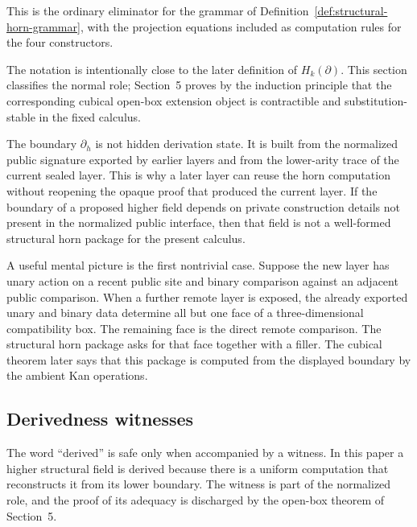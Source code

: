 \documentclass{lmcs}
\begin{document}
This is the ordinary eliminator for the grammar of
Definition~\ref{def:structural-horn-grammar}, with the projection equations included as
computation rules for the four constructors.

The notation is intentionally close to the later definition of \(H_k(\partial)\).  This
section classifies the normal role; Section~5 proves by the induction principle that the
corresponding cubical open-box extension object is contractible and substitution-stable in
the fixed calculus.

\begin{rem}
The boundary \(\partial_h\) is not hidden derivation state.  It is built from the normalized
public signature exported by earlier layers and from the lower-arity trace of the current
sealed layer.  This is why a later layer can reuse the horn computation without reopening the
opaque proof that produced the current layer.  If the boundary of a proposed higher field
depends on private construction details not present in the normalized public interface, then
that field is not a well-formed structural horn package for the present calculus.
\end{rem}

A useful mental picture is the first nontrivial case.  Suppose the new layer has unary action
on a recent public site and binary comparison against an adjacent public comparison.  When a
further remote layer is exposed, the already exported unary and binary data determine all
but one face of a three-dimensional compatibility box.  The remaining face is the direct
remote comparison.  The structural horn package asks for that face together with a filler.
The cubical theorem later says that this package is computed from the displayed boundary by
the ambient Kan operations.

\subsection{Derivedness witnesses}

The word ``derived'' is safe only when accompanied by a witness.  In this paper a higher
structural field is derived because there is a uniform computation that reconstructs it from
its lower boundary.  The witness is part of the normalized role, and the proof of its adequacy
is discharged by the open-box theorem of Section~5.
\end{document}
